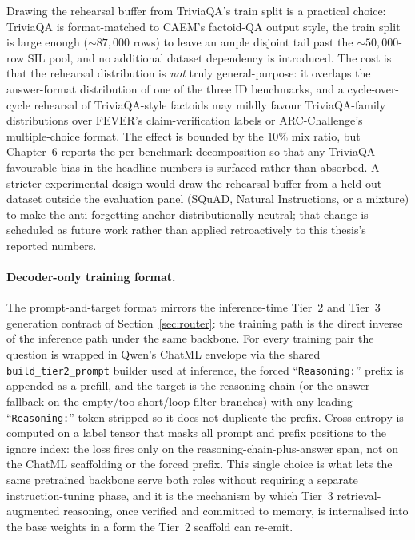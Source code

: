 Drawing the rehearsal buffer from TriviaQA's train split is a practical choice: TriviaQA is format-matched to CAEM's factoid-QA output style, the train split is large enough ($\sim\!87{,}000$ rows) to leave an ample disjoint tail past the $\sim\!50{,}000$-row SIL pool, and no additional dataset dependency is introduced. The cost is that the rehearsal distribution is \emph{not} truly general-purpose: it overlaps the answer-format distribution of one of the three ID benchmarks, and a cycle-over-cycle rehearsal of TriviaQA-style factoids may mildly favour TriviaQA-family distributions over FEVER's claim-verification labels or ARC-Challenge's multiple-choice format. The effect is bounded by the $10\%$ mix ratio, but Chapter~6 reports the per-benchmark decomposition so that any TriviaQA-favourable bias in the headline numbers is surfaced rather than absorbed. A stricter experimental design would draw the rehearsal buffer from a held-out dataset outside the evaluation panel (SQuAD, Natural Instructions, or a mixture) to make the anti-forgetting anchor distributionally neutral; that change is scheduled as future work rather than applied retroactively to this thesis's reported numbers.

\paragraph{Decoder-only training format.}
The prompt-and-target format mirrors the inference-time Tier~2 and Tier~3 generation contract of Section~\ref{sec:router}: the training path is the direct inverse of the inference path under the same backbone. For every training pair the question is wrapped in Qwen's ChatML envelope via the shared \texttt{build\_tier2\_prompt} builder used at inference, the forced ``\texttt{Reasoning:}'' prefix is appended as a prefill, and the target is the reasoning chain (or the answer fallback on the empty/too-short/loop-filter branches) with any leading ``\texttt{Reasoning:}'' token stripped so it does not duplicate the prefix. Cross-entropy is computed on a label tensor that masks all prompt and prefix positions to the ignore index: the loss fires only on the reasoning-chain-plus-answer span, not on the ChatML scaffolding or the forced prefix. This single choice is what lets the same pretrained backbone serve both roles without requiring a separate instruction-tuning phase, and it is the mechanism by which Tier~3 retrieval-augmented reasoning, once verified and committed to memory, is internalised into the base weights in a form the Tier~2 scaffold can re-emit.

